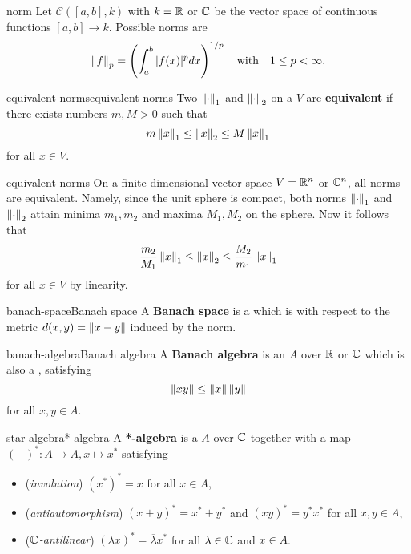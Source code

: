 \begin{example}{norm}
    Let $\mathcal{C}([a, b], k)$ with $k = \mathbb{R}$ or $\mathbb{C}$ be the vector space of continuous functions $[a, b] \to k$. Possible norms are
    \[ \left\|f\right\|_p = \left(\int_a^b |f(x)|^p dx \right)^{1/p} \quad \text{with} \quad 1 \le p < \infty . \]
\end{example}

\begin{topic}{equivalent-norms}{equivalent norms}
    Two  $\left\|\cdot\right\|_1$ and $\left\|\cdot\right\|_2$ on a  $V$ are \textbf{equivalent} if there exists numbers $m, M > 0$ such that
    \[ m \left\|x\right\|_1 \le \left\|x\right\|_2 \le M \left\|x\right\|_1 \]
    for all $x \in V$.
\end{topic}

\begin{example}{equivalent-norms}
    On a finite-dimensional vector space $V = \mathbb{R}^n$ or $\mathbb{C}^n$, all norms are equivalent. Namely, since the unit sphere is compact, both norms $\left\|\cdot\right\|_1$ and $\left\|\cdot\right\|_2$ attain minima $m_1, m_2$ and maxima $M_1, M_2$ on the sphere. Now it follows that
    \[ \frac{m_2}{M_1} \left\|x\right\|_1 \le \left\|x\right\|_2 \le \frac{M_2}{m_1} \left\|x\right\|_1 \]
    for all $x \in V$ by linearity.
\end{example}

\begin{topic}{banach-space}{Banach space}
    A \textbf{Banach space} is a   which is  with respect to the metric $d(x, y) = \left\|x - y\right\|$ induced by the norm.
\end{topic}

\begin{topic}{banach-algebra}{Banach algebra}
    A \textbf{Banach algebra} is an  $A$ over $\mathbb{R}$ or $\mathbb{C}$ which is also a , satisfying
    \[ \left\|xy\right\| \le \left\|x\right\| \left\|y\right\| \]
    for all $x, y \in A$.
\end{topic}

\begin{topic}{star-algebra}{*-algebra}
    A \textbf{*-algebra} is a  $A$ over $\mathbb{C}$ together with a map $(-)^* : A \to A, x \mapsto x^*$ satisfying
    \begin{itemize}
        \item (\textit{involution}) $(x^*)^* = x$ for all $x \in A$,
        \item (\textit{antiautomorphism}) $(x + y)^* = x^* + y^*$ and $(xy)^* = y^* x^*$ for all $x, y \in A$,
        \item (\textit{$\mathbb{C}$-antilinear}) $(\lambda x)^* = \overline{\lambda} x^*$ for all $\lambda \in \mathbb{C}$ and $x \in A$.
    \end{itemize}
\end{topic}

